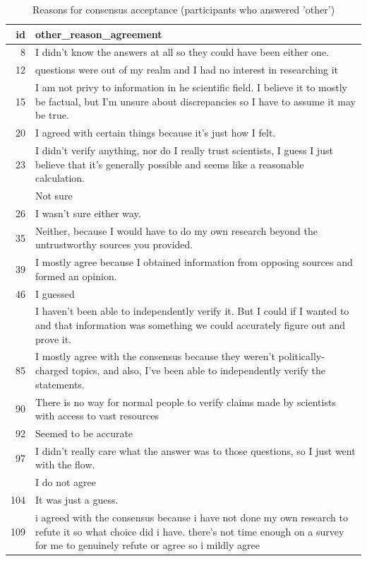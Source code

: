 \documentclass[
  doc,floatsintext]{apa6}
\begin{document}
\begin{longtable}[t]{>{}r>{\raggedright\arraybackslash}p{30em}}
\caption{\label{tab:exp4-other-reasons-acceptance}Reasons for consensus acceptance (participants who answered 'other')}\\
\toprule
id & other\_reason\_agreement\\
\midrule
8 & I didn’t know the answers at all so they could have been either one.\\
12 & questions were out of my realm and I had no interest in researching it\\
15 & I am not privy to information in he scientific field. I believe it to mostly be factual, but I'm unsure about discrepancies so I have to assume it may be true.\\
20 & I agreed with certain things because it's just how I felt.\\
23 & I didn't verify anything, nor do I really trust scientists, I guess I just believe that it's generally possible and seems like a reasonable calculation.\\
\addlinespace
25 & Not sure\\
26 & I wasn't sure either way.\\
35 & Neither, because I would have to do my own research beyond the untrustworthy sources you provided.\\
39 & I mostly agree because I obtained information from opposing sources and formed an opinion.\\
46 & I guessed\\
\addlinespace
63 & I haven't been able to independently verify it.  But I could if I wanted to and that information was something we could accurately figure out and prove it.\\
85 & I mostly agree with the consensus because they weren't politically-charged topics, and also, I've been able to independently verify the statements.\\
90 & There is no way for normal people to verify claims made by scientists with access to vast resources\\
92 & Seemed to be accurate\\
97 & I didn't really care what the answer was to those questions, so I just went with the flow.\\
\addlinespace
99 & I do not agree\\
104 & It was just a guess.\\
109 & i agreed with the consensus because i have not done my own research to refute it so what choice did i have. there’s not time enough on a survey for me to genuinely refute or agree so i mildly agree\\

\end{longtable}
\end{document}
